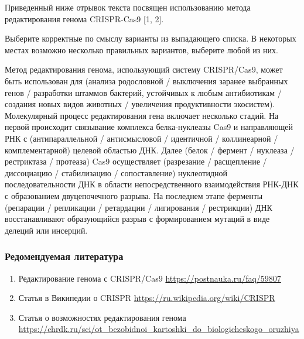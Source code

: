 
Приведенный ниже отрывок текста посвящен использованию метода редактирования генома CRISPR-Cas9 [1, 2].

Выберите корректные по смыслу варианты из выпадающего списка. В некоторых местах возможно несколько правильных вариантов, выберите любой из них.

Метод редактирования генома, использующий систему CRISPR/Cas9, может быть использован для 
(анализа родословной / выключения заранее выбранных генов / разработки штаммов бактерий, устойчивых к любым антибиотикам /
создания новых видов животных / увеличения продуктивности экосистем). 
Молекулярный процесс редактирования гена включает несколько стадий. На первой происходит связывание комплекса белка-нуклеазы Cas9 и направляющей РНК с
(антипараллельной / антисмысловой / идентичной / коллинеарной / комплементарной) целевой областью ДНК. Далее 
(белок / фермент / нуклеаза / рестриктаза / протеаза) Cas9 осуществляет 
(разрезание / расщепление / диссоциацию / стабилизацию / сопоставление) нуклеотидной последовательности ДНК в области непосредственного взаимодействия РНК-ДНК с образованием двуцепочечного разрыва. На последнем этапе ферменты 
(репарации / репликации / ретардации / лигирования / рестрикции) ДНК восстанавливают образующийся разрыв с формированием мутаций в виде делеций или инсерций.

\subsubsection*{Редомендуемая литература}

\begin{enumerate}
    \item Редактирование генома с CRISPR/Cas9 \url{https://postnauka.ru/faq/59807}
    \item Статья в Википедии о CRISPR \url{https://ru.wikipedia.org/wiki/CRISPR}
    \item Статья о возможностях редактирования генома \url{https://chrdk.ru/sci/ot_bezobidnoi_kartoshki_do_biologicheskogo_oruzhiya}
\end{enumerate}